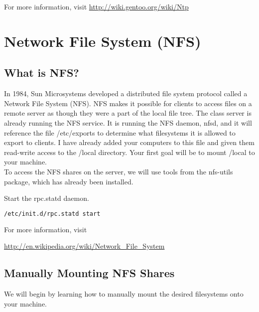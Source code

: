 \documentclass[11pt]{article}
\begin{document}
For more information, visit 
\url{http://wiki.gentoo.org/wiki/Ntp}



\section*{Network File System (NFS)}

\subsection*{What is NFS?}

\indent\indent In 1984, Sun Microsystems developed a distributed file system protocol called a Network File System (NFS). NFS makes it possible for clients to access files on a remote server as though they were a part of the local file tree. The class server is already running the NFS service. It is running the NFS daemon, nfsd, and it will reference the file /etc/exports to determine what filesystems it is allowed to export to clients. I have already added your computers to this file and given them read-write access to the /local directory. Your first goal will be to mount /local to your machine.\\
		
		To access the NFS shares on the server, we will use tools from the nfs-utils package, which has already been installed.	
		

Start the rpc.statd daemon.

\begin{lstlisting}[basicstyle=\ttfamily, backgroundcolor = \color{lightgray}, language = bash, xleftmargin = 0cm, framexleftmargin = 1em]
/etc/init.d/rpc.statd start
\end{lstlisting} 	


	For more information, visit 

	\url{http://en.wikipedia.org/wiki/Network_File_System}
	
	\subsection*{Manually Mounting NFS Shares}
		We will begin by learning how to manually mount the desired filesystems onto your machine. 
		
\end{document}
